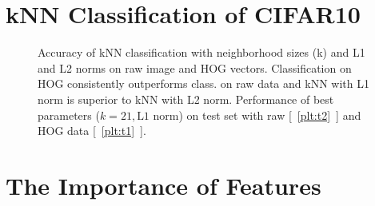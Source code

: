 \clearpage
\section{kNN Classification of CIFAR10} %



\begin{figure}[h!]
\newcommand{\plotref}[1]{{[~\ref{plt:#1}~]}}
\centering

\caption{Accuracy of kNN classification with neighborhood sizes (k) and L1 and L2 norms on raw image and HOG vectors. Classification on HOG consistently outperforms class. on raw data and kNN with L1 norm is superior to kNN with L2 norm. Performance of best parameters ($k=21, \text{L1 norm}$) on test set with raw \plotref{t2} and HOG data \plotref{t1}. }

\end{figure}


\section{The Importance of Features} %
